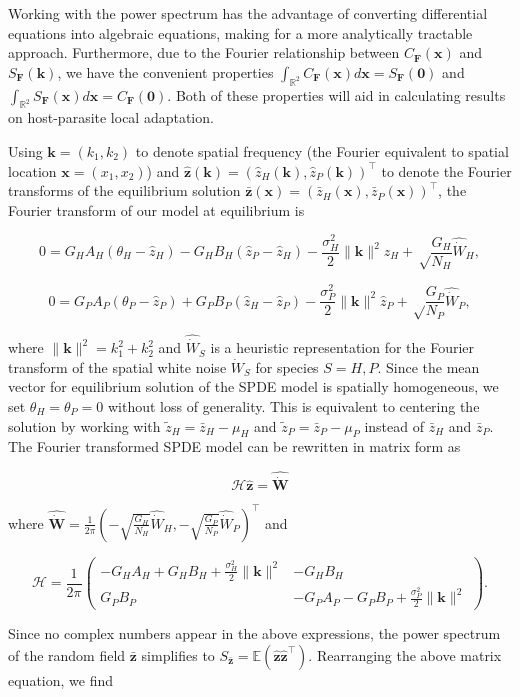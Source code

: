 \documentclass{article}
\begin{document}
Working with the power spectrum has the advantage of converting
differential equations into algebraic equations, making for a more
analytically tractable approach. Furthermore, due to the Fourier
relationship between \(C_{\pmb F}(\pmb x)\) and \(S_{\pmb F}(\pmb k)\),
we have the convenient properties
\(\int_{\mathbb R^2}C_{\pmb F}(\pmb x)d\pmb x=S_{\pmb F}(\pmb 0)\) and
\(\int_{\mathbb R^2}S_{\pmb F}(\pmb x)d\pmb x=C_{\pmb F}(\pmb 0)\). Both
of these properties will aid in calculating results on host-parasite
local adaptation.

Using \(\pmb k=(k_1,k_2)\) to denote spatial frequency (the Fourier
equivalent to spatial location \(\pmb x=(x_1,x_2)\)) and
\(\hat{\pmb z}(\pmb k)=(\hat z_H(\pmb k),\hat z_P(\pmb k))^\top\) to
denote the Fourier transforms of the equilibrium solution
\(\bar{\pmb z}(\pmb x)=(\bar z_H(\pmb x),\bar z_P(\pmb x))^\top\), the
Fourier transform of our model at equilibrium is

\[0=G_HA_H(\theta_H-\hat z_H)-G_HB_H(\hat z_P-\hat z_H)-\frac{\sigma_H^2}{2}\|\pmb k\|^2\hat z_H+\sqrt\frac{G_H}{N_H}\widehat{\dot W}_H,\]

\[0=G_PA_P(\theta_P-\hat z_P)+G_PB_P(\hat z_H-\hat z_P)-\frac{\sigma_P^2}{2}\|\pmb k\|^2\hat z_P+\sqrt\frac{G_P}{N_P}\widehat{\dot W}_P,\]

where \(\|\pmb k\|^2=k_1^2+k_2^2\) and \(\widehat{\dot W}_S\) is a
heuristic representation for the Fourier transform of the spatial white
noise \(\dot W_S\) for species \(S=H,P\). Since the mean vector for
equilibrium solution of the SPDE model is spatially homogeneous, we set
\(\theta_H=\theta_P=0\) without loss of generality. This is equivalent
to centering the solution by working with \(\tilde z_H=\bar z_H-\mu_H\)
and \(\tilde z_P=\bar z_P-\mu_P\) instead of \(\bar z_H\) and
\(\bar z_P\). The Fourier transformed SPDE model can be rewritten in
matrix form as

\[\mathscr H\hat{\pmb z}=\widehat{\dot{\pmb W}}\]

where
\(\widehat{\dot{\pmb W}}=\tfrac{1}{2\pi}\left(-\sqrt{\tfrac{G_H}{N_H}}\hat{\dot W}_H, -\sqrt{\tfrac{G_P}{N_P}}\hat{\dot W}_P\right)^\top\)
and

\[\mathscr H=\frac{1}{2\pi}\left(\begin{matrix}-G_HA_H+G_HB_H+\frac{\sigma_H^2}{2}\|\pmb k\|^2 & -G_HB_H \\ G_PB_P & -G_PA_P-G_PB_P+\frac{\sigma_P^2}{2}\|\pmb k\|^2\end{matrix}\right).\]

Since no complex numbers appear in the above expressions, the power
spectrum of the random field \(\bar{\pmb z}\) simplifies to
\(S_{\bar{\pmb z}}=\mathbb E\left(\hat{\pmb z}\hat{\pmb z}^\top\right)\).
Rearranging the above matrix equation, we find
\end{document}
